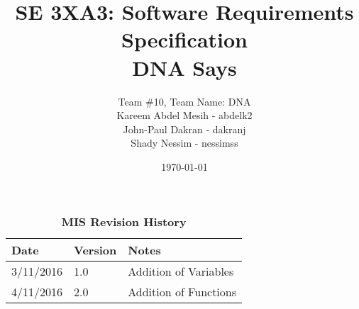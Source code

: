 \documentclass[12pt, titlepage]{article}
\title{SE 3XA3: Software Requirements Specification\\DNA Says}
\author{Team \#10, Team Name: DNA
		\\ Kareem Abdel Mesih - abdelk2
		\\ John-Paul Dakran - dakranj
		\\ Shady Nessim - nessimss
}
\date{\today}
\begin{document}
\maketitle


\begin{table}[bp]
\caption{\bf MIS Revision History}
\begin{tabularx}{\textwidth}{p{3cm}p{2cm}X}
\toprule {\bf Date} & {\bf Version} & {\bf Notes}\\
\midrule
3/11/2016 & 1.0 & Addition of Variables\\
4/11/2016 & 2.0 & Addition of Functions\\
\bottomrule
\end{tabularx}
\end{table}

\newpage

\end{document}
